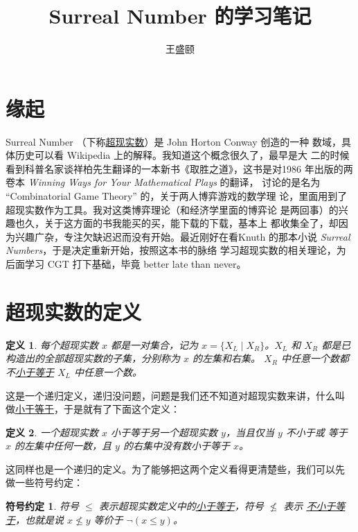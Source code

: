 \documentclass[cs4size,a4paper,adobefonts]{ctexart}
\newtheorem{defn}{定义}
\newcommand{\pname}[1]{\underline{#1}}
\numberwithin{equation}{section}
\begin{document}
\title{\bfseries Surreal Number 的学习笔记}
\author{王盛颐}
\date{}
\maketitle
\section{缘起}

Surreal Number （下称\pname{超现实数}）是 John Horton Conway 创造的一种
数域，具体历史可以看 Wikipedia 上的解释。我知道这个概念很久了，最早是大
二的时候看到科普名家谈祥柏先生翻译的一本新书《取胜之道》，这书是对1986
年出版的两卷本 \textit{Winning Ways for Your Mathematical Plays} 的翻译，
讨论的是名为 ``Combinatorial Game Theory'' 的，关于两人博弈游戏的数学理
论，里面用到了超现实数作为工具。我对这类博弈理论（和经济学里面的博弈论
  是两回事）的兴趣也久，关于这方面的书我能买的买，能下载的下载，基本上
都收集全了，却因为兴趣广杂，专注欠缺迟迟而没有开始。最近刚好在看Knuth
的那本小说 \textit{Surreal Numbers}，于是决定重新开始，按照这本书的脉络
学习超现实数的相关理论，为后面学习 CGT 打下基础，毕竟 better late than
never。

\section{超现实数的定义}
\begin{defn}
  \label{defn:Surreal}
  每个超现实数 $x$ 都是一对集合，记为 $x=\{X_L \mid X_R\}$。$X_L$ 和
  $X_R$ 都是已构造出的全部超现实数的子集，分别称为 $x$ 的左集和右集。
  $X_R$ 中任意一个数都不\pname{小于等于} $X_L$ 中任意一个数。
\end{defn}

这是一个递归定义，递归没问题，问题是我们还不知道对超现实数来讲，什么叫
做\pname{小于等于}，于是就有了下面这个定义：

\begin{defn}
  \label{defn:Leq}
  一个超现实数 $x$ 小于等于另一个超现实数 $y$，当且仅当 $y$ 不小于或
  等于 $x$ 的左集中任何一数，且 $y$ 的右集中没有数小于等于 $x$。
\end{defn}

这同样也是一个递归的定义。为了能够把这两个定义看得更清楚些，我们可以先
做一些符号约定：

\newtheorem*{symbolDef}{符号约定}
\begin{symbolDef}
  符号 $\leq$ 表示超现实数定义中的\pname{小于等于}，符号 $\nleq$ 表示
  \pname{不小于等于}，也就是说 $x \nleq y$ 等价于 $\neg(x \leq y)$。
\end{symbolDef}
\end{document}
